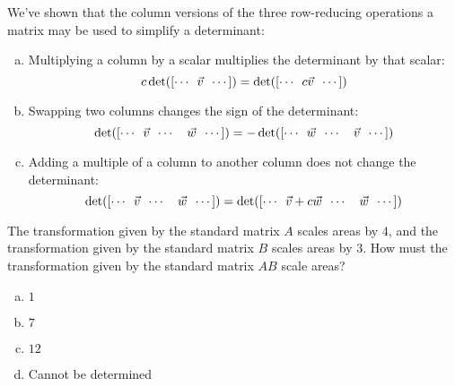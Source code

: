 \begin{applicationActivities}
\begin{fact}
  We've shown that the column versions of the three row-reducing operations
  a matrix may be used to simplify a determinant:
  \begin{enumerate}[(a)]
  \item Multiplying a column by a scalar multiplies the
        determinant by that scalar:
        \[c\det([\cdots\hspace{0.5em}\vec{v}\hspace{0.5em} \cdots])=
        \det([\cdots\hspace{0.5em}c\vec{v}\hspace{0.5em} \cdots])\]
  \item Swapping two columns changes the sign of the determinant:
        \[\det([\cdots\hspace{0.5em}\vec{v}\hspace{0.5em}
        \cdots\hspace{1em}\vec{w}\hspace{0.5em} \cdots])=
        -\det([\cdots\hspace{0.5em}\vec{w}\hspace{0.5em}
        \cdots\hspace{1em}\vec{v}\hspace{0.5em} \cdots])\]
  \item Adding a multiple of a column to another column does not
        change the determinant:
        \[\det([\cdots\hspace{0.5em}\vec{v}\hspace{0.5em}
        \cdots\hspace{1em}\vec{w}\hspace{0.5em} \cdots])=
        \det([\cdots\hspace{0.5em}\vec{v}+c\vec{w}\hspace{0.5em}
        \cdots\hspace{1em}\vec{w}\hspace{0.5em} \cdots])\]
  \end{enumerate}
\end{fact}

\begin{activity}{5}
  The transformation given by the standard matrix \(A\) scales areas by
  \(4\), and the transformation given by the standard matrix \(B\) scales
  areas by \(3\). How must the transformation given by the standard matrix
  \(AB\) scale areas?
  \begin{enumerate}[(a)]
  \item \(1\)
  \item \(7\)
  \item \(12\)
  \item Cannot be determined
  \end{enumerate}


\end{activity}
\end{applicationActivities}
